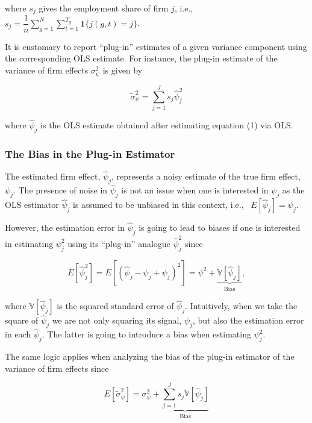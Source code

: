 \documentclass[11pt]{article}
\begin{document}
where $s_{j}$ gives the employment share of firm $j$, i.e., $s_{j}=\dfrac{1}{n}\sum_{g=1}^{N}\sum_{t=1}^{T_{g}}\mathbf{1}\{j(g,t)=j\}$.

It is customary to report ``plug-in'' estimates of a given variance
component using the corresponding OLS estimate. For instance, the
plug-in estimate of the variance of firm effects \(\sigma_{\psi }^2\) is
given by

\begin{equation}
\tilde{\sigma}_{\psi}^2=\sum_{j=1}^J s_{j}\hat{\psi}^{2}_{j}
\end{equation}

where \(\hat{\psi}_{j}\) is the OLS estimate obtained after estimating
equation (1) via OLS.

\hypertarget{the-bias-in-the-plug-in-estimator}{%
\subsubsection{The Bias in the Plug-in
Estimator}\label{the-bias-in-the-plug-in-estimator}}

The estimated firm effect, \(\hat{\psi}_{j}\), represents a noisy
estimate of the true firm effect, \(\psi_{j}\). The presence of noise in
\(\hat{\psi}_{j}\) is not an issue when one is interested in
\(\psi_{j}\) as the OLS estimator \(\hat{\psi}_{j}\) is assumed to be
unbiased in this context, i.e., ~\(E[\hat{\psi}_{j}]=\psi_{j}\).

However, the estimation error in \(\hat{\psi}_{j}\) is going to lead to
biases if one is interested in estimating \(\psi_{j}^{2}\) using its ``plug-in'' analogue
\(\hat{\psi}_{j}^{2}\) since

\begin{equation}
E[\hat{\psi}_{j}^{2}]=E[(\hat{\psi}_{j}-\psi_{j}+\psi_{j})^2]=\psi^{2}+\underbrace{\mathbb{V}[\hat{\psi}_{j}]}_{\text{Bias}},
\end{equation}

where \(\mathbb{V}[\hat{\psi}_{j}]\) is the squared standard error of
\(\hat{\psi}_{j}\). Intuitively, when we take the square of
\(\hat{\psi}_{j}\) we are not only squaring its signal, \(\psi_{j}\),
but also the estimation error in each \(\hat{\psi}_{j}\). The latter is
going to introduce a bias when estimating \(\psi^{2}_{j}\).

The same logic applies when analyzing the bias of the plug-in estimator
of the variance of firm effects since

\begin{equation}
E[\tilde{\sigma}_{\psi}^2]=\sigma^{2}_{\psi}+\underbrace{\sum_{j=1}^{J}s_{j}{\mathbb{V}[\hat{\psi}_{j}]}}_{\text{Bias}}
\end{equation}
\end{document}
